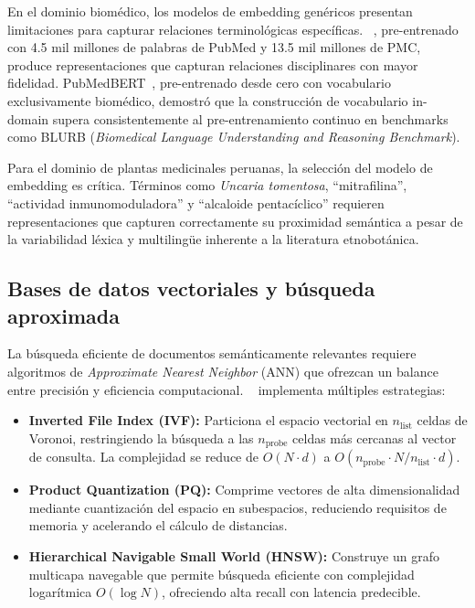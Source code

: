 En el dominio biomédico, los modelos de embedding genéricos presentan limitaciones para capturar relaciones terminológicas específicas. \biobert{}~\cite{lee2020biobert}, pre-entrenado con 4.5 mil millones de palabras de PubMed y 13.5 mil millones de PMC, produce representaciones que capturan relaciones disciplinares con mayor fidelidad. PubMedBERT~\cite{gu2021domain}, pre-entrenado desde cero con vocabulario exclusivamente biomédico, demostró que la construcción de vocabulario in-domain supera consistentemente al pre-entrenamiento continuo en benchmarks como BLURB (\textit{Biomedical Language Understanding and Reasoning Benchmark}).

Para el dominio de plantas medicinales peruanas, la selección del modelo de embedding es crítica. Términos como \textit{Uncaria tomentosa}, ``mitrafilina'', ``actividad inmunomoduladora'' y ``alcaloide pentacíclico'' requieren representaciones que capturen correctamente su proximidad semántica a pesar de la variabilidad léxica y multilingüe inherente a la literatura etnobotánica.

\subsection{Bases de datos vectoriales y búsqueda aproximada}
\label{subsec:tf_vectordb}

La búsqueda eficiente de documentos semánticamente relevantes requiere algoritmos de \textit{Approximate Nearest Neighbor} (ANN) que ofrezcan un balance entre precisión y eficiencia computacional. \faiss{}~\cite{johnson2021billion} implementa múltiples estrategias:

\begin{itemize}[leftmargin=*]
  \item \textbf{Inverted File Index (IVF):} Particiona el espacio vectorial en $n_{\text{list}}$ celdas de Voronoi, restringiendo la búsqueda a las $n_{\text{probe}}$ celdas más cercanas al vector de consulta. La complejidad se reduce de $O(N \cdot d)$ a $O(n_{\text{probe}} \cdot N/n_{\text{list}} \cdot d)$.

  \item \textbf{Product Quantization (PQ):} Comprime vectores de alta dimensionalidad mediante cuantización del espacio en subespacios, reduciendo requisitos de memoria y acelerando el cálculo de distancias.

  \item \textbf{Hierarchical Navigable Small World (HNSW):} Construye un grafo multicapa navegable que permite búsqueda eficiente con complejidad logarítmica $O(\log N)$, ofreciendo alta recall con latencia predecible.
\end{itemize}

